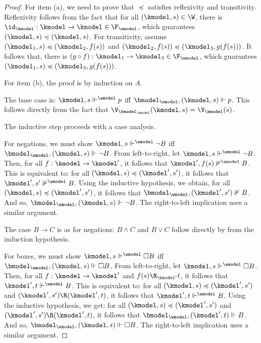 \begin{proof}
  For item (a), we need to prove that $\preccurlyeq$ satisfies reflexivity and transitivity.
  Reflexivity follows from the fact that for all $(\kmodel, s) \in \W$, there is ${\id_{\kmodel}: \kmodel \to \kmodel} \in \F_{\wmodel}$, which guarantees $(\kmodel, s) \preccurlyeq (\kmodel, s)$.
  For transitivity, assume $(\kmodel_1, s) \preccurlyeq (\kmodel_2, f(s))$ and $(\kmodel_2, f(s)) \preccurlyeq (\kmodel_3, g(f(s)))$.
  It follows that, there is ${(g \circ f): \kmodel_1 \to \kmodel_3} \in \F_{\wmodel}$, which guarantees $(\kmodel_1, s) \preccurlyeq (\kmodel_3, g(f(s)))$.

  \medskip
  \noindent
  For item (b), the proof is by induction on $A$.

  \medskip
  \noindent
  The base case is: $\kmodel, s \Vdash^{\wmodel} p$ iff $\bmodel_{\wmodel}, (\kmodel,s) \Vdash p$.
  This follows directly from the fact that $\V_{\bmodel_{\wmodel}}(\kmodel, s) = \V_{\kmodel}(s)$.
  
  \medskip
  \noindent
  The inductive step proceeds with a case analysis.

  \medskip
  \noindent
  For negations, we must show $\kmodel, s \Vdash^{\wmodel} \lnot B$ iff $\bmodel_{\wmodel}, (\kmodel,s) \Vdash \lnot B$.
  From left-to-right, let $\kmodel, s \Vdash^{\wmodel} \lnot B$.
  Then, for all ${f: \kmodel \to \kmodel'}$, it follows that $\kmodel', f(s) \nVdash^{\wmodel} B$.
  This is equivalent to: for all $(\kmodel, s) \preccurlyeq (\kmodel', s')$, it follows that $\kmodel', s' \nVdash^{\wmodel} B$.
  Using the inductive hypothesis, we obtain, for all $(\kmodel, s) \preccurlyeq (\kmodel', s')$, it follows that $\bmodel_{\wmodel}, (\kmodel', s') \nVdash B$.
  And so, $\bmodel_{\wmodel}, (\kmodel, s) \Vdash \lnot B$.
  The right-to-left implication uses a similar argument.

  \medskip
  \noindent
  The case $B \to C$ is as for negations; $B \land C$ and $B \lor C$ follow directly by from the induction hypothesis.

  \medskip
  \noindent
  For boxes, we must show $\kmodel, s \Vdash^{\wmodel} \Box B$ iff $\bmodel_{\wmodel}, (\kmodel,s) \Vdash \Box B$.
  From left-to-right, let $\kmodel, s \Vdash^{\wmodel} \Box B$.
  Then, for all ${f: \kmodel \to \kmodel'}$ and $f(s) \R_{\kmodel'} t$, it follows that $\kmodel', t \Vdash^{\wmodel} B$.
  This is equivalent to: for all $(\kmodel, s) \preccurlyeq (\kmodel', s')$ and $(\kmodel', s') \R (\kmodel',t)$, it follows that $\kmodel', t \Vdash^{\wmodel} B$.
  Using the inductive hypothesis, we get: for all $(\kmodel, s) \preccurlyeq (\kmodel', s')$ and $(\kmodel', s') \R (\kmodel',t)$, it follows that $\bmodel_{\wmodel}, (\kmodel', t) \Vdash B$.
  And so, $\bmodel_{\wmodel}, (\kmodel, s) \Vdash \Box B$.
  The right-to-left implication uses a similar argument.


\end{proof}
